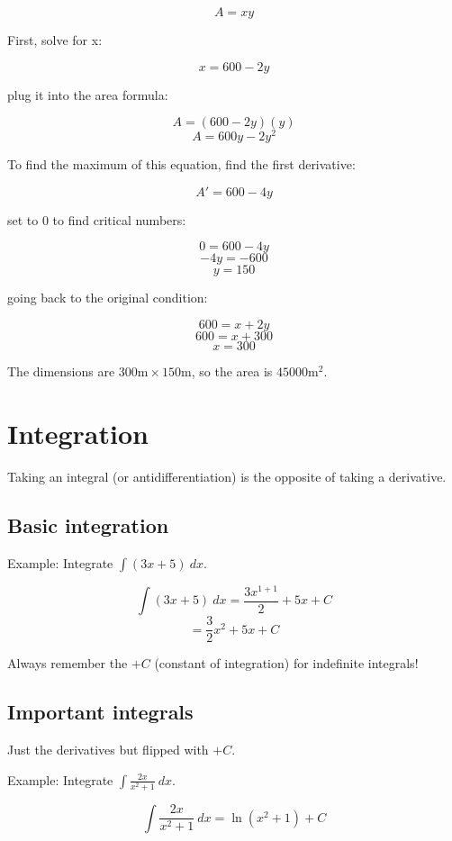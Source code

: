\documentclass[letterpaper, 12pt]{article}
\begin{document}
$$ A = xy $$

First, solve for x:

$$ x = 600 - 2y $$

plug it into the area formula:

$$ A = (600-2y)(y) $$
$$ A = 600y - 2y^2$$

To find the maximum of this equation, find the first derivative:

$$A' = 600 - 4y$$

set to 0 to find critical numbers:

$$ 0 = 600 - 4y$$
$$ -4y = -600 $$
$$ y = 150 $$

going back to the original condition:

$$ 600 = x + 2y $$
$$ 600 = x + 300$$
$$ x = 300$$

The dimensions are $300 \mathrm{m} \times 150 \mathrm{m} $, so the area is $\boxed{45000 \mathrm{m}^2}$.

\section*{Integration}
Taking an integral (or antidifferentiation) is the opposite of taking a derivative.

\subsection*{Basic integration}
Example: Integrate $\displaystyle \int (3x + 5) \: dx$.

$$\displaystyle \int (3x + 5) \: dx = \frac{3x^{1+1}}{2} + 5x + C$$
$$ = \boxed{\frac{3}{2}x^2 + 5x + C}$$

Always remember the $+C$ (constant of integration) for indefinite integrals!

\subsection*{Important integrals}
Just the derivatives but flipped with $+C$.

Example: Integrate $\displaystyle \int \frac{2x}{x^2+1} \: dx$.

$$\displaystyle \int \frac{2x}{x^2+1} \: dx = \boxed{\ln (x^2+1) + C}$$
\end{document}

